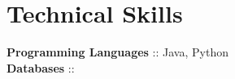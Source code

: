
\section{Technical Skills}
    \begin{itemize}[leftmargin=0.15in, label={}]
    \small{
    \item{
    
        \textbf{ Programming Languages }:{: Java, Python } \\
    
        \textbf{ Databases }:{:  } \\
    
    }}
    \end{itemize}